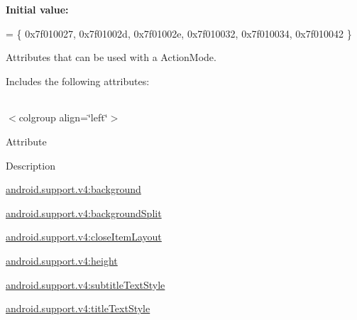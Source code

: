 {\bfseries Initial value\+:}
\begin{DoxyCode}
= \{
            0x7f010027, 0x7f01002d, 0x7f01002e, 0x7f010032,
            0x7f010034, 0x7f010042
        \}
\end{DoxyCode}
Attributes that can be used with a Action\+Mode. 

Includes the following attributes\+:

\tabulinesep=1mm
\begin{longtabu} spread 0pt [c]{*{0}{|X[-1]}|}
\hline
\end{longtabu}
$<$colgroup align=\char`\"{}left\char`\"{}$>$ 

Attribute

Description 

{\ttfamily \hyperlink{classandroid_1_1support_1_1v4_1_1R_1_1styleable_af8dfe84037d44a20d600812c83f8ae9f}{android.\+support.\+v4\+:background}}

{\ttfamily \hyperlink{classandroid_1_1support_1_1v4_1_1R_1_1styleable_a094ac55778c3da81ee995f4d661dcdd3}{android.\+support.\+v4\+:background\+Split}}

{\ttfamily \hyperlink{classandroid_1_1support_1_1v4_1_1R_1_1styleable_ac74559c17d14835068971c8a43ee0089}{android.\+support.\+v4\+:close\+Item\+Layout}}

{\ttfamily \hyperlink{classandroid_1_1support_1_1v4_1_1R_1_1styleable_a4c33e09d0d28a0556eb95a6d8e79d430}{android.\+support.\+v4\+:height}}

{\ttfamily \hyperlink{classandroid_1_1support_1_1v4_1_1R_1_1styleable_adf85b77127f085c08ae9f7876b127ae8}{android.\+support.\+v4\+:subtitle\+Text\+Style}}

{\ttfamily \hyperlink{classandroid_1_1support_1_1v4_1_1R_1_1styleable_a76cacf108986d54131f84ffbda5ddc84}{android.\+support.\+v4\+:title\+Text\+Style}}

